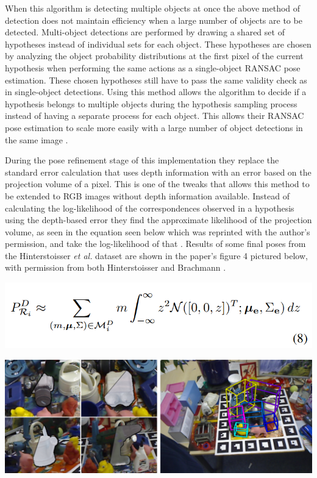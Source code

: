 \documentclass[12pt]{article}
\let\origfigure=\figure
\let\endorigfigure=\endfigure
\renewenvironment{figure}[1][]{%
  \origfigure[H]
}{%
  \endorigfigure
}
\begin{document}
When this algorithm is detecting multiple objects at once the above
method of detection does not maintain efficiency when a large number of
objects are to be detected. Multi-object detections are performed by
drawing a shared set of hypotheses instead of individual sets for each
object. These hypotheses are chosen by analyzing the object probability
distributions at the first pixel of the current hypothesis when
performing the same actions as a single-object RANSAC pose estimation.
These chosen hypotheses still have to pass the same validity check as in
single-object detections. Using this method allows the algorithm to
decide if a hypothesis belongs to multiple objects during the hypothesis
sampling process instead of having a separate process for each object.
This allows their RANSAC pose estimation to scale more easily with a
large number of object detections in the same image
\autocite{brachmann}.

During the pose refinement stage of this implementation they replace the
standard error calculation that uses depth information with an error
based on the projection volume of a pixel. This is one of the tweaks
that allows this method to be extended to RGB images without depth
information available. Instead of calculating the log-likelihood of the
correspondences observed in a hypothesis using the depth-based error
they find the approximate likelihood of the projection volume, as seen
in the equation seen below which was reprinted with the author's
permission, and take the log-likelihood of that \autocite{brachmann}.
Results of some final poses from the Hinterstoisser \emph{et al.}
dataset are shown in the paper's figure 4 pictured below, with
permission from both Hinterstoisser and Brachmann
\autocites{brachmann}{hinterstoisser}.

\begin{figure}
\centering
\includegraphics{Pictures/eq8.png}
\caption{Equation for projection volume approximation}
\end{figure}

\begin{figure}
\centering
\includegraphics{Pictures/figure4.png}
\caption{Pose Overlays}
\end{figure}
\end{document}
